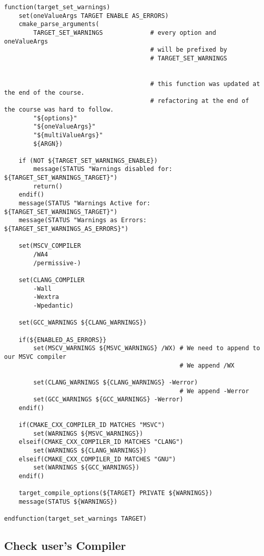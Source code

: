 \documentclass[openany]{report}
\begin{document}
\begin{verbatim}
function(target_set_warnings)
    set(oneValueArgs TARGET ENABLE AS_ERRORS)
    cmake_parse_arguments(
        TARGET_SET_WARNINGS             # every option and oneValueArgs
                                        # will be prefixed by
                                        # TARGET_SET_WARNINGS


                                        # this function was updated at the end of the course.
                                        # refactoring at the end of the course was hard to follow.
        "${options}"
        "${oneValueArgs}"
        "${multiValueArgs}"
        ${ARGN})

    if (NOT ${TARGET_SET_WARNINGS_ENABLE})
        message(STATUS "Warnings disabled for: ${TARGET_SET_WARNINGS_TARGET}")
        return()
    endif()
    message(STATUS "Warnings Active for: ${TARGET_SET_WARNINGS_TARGET}")
    message(STATUS "Warnings as Errors: ${TARGET_SET_WARNINGS_AS_ERRORS}")

    set(MSCV_COMPILER
        /WA4
        /permissive-)

    set(CLANG_COMPILER
        -Wall
        -Wextra
        -Wpedantic)

    set(GCC_WARNINGS ${CLANG_WARNINGS})

    if(${ENABLED_AS_ERRORS}}
        set(MSCV_WARNINGS ${MSVC_WARNINGS} /WX) # We need to append to our MSVC compiler
                                                # We append /WX

        set(CLANG_WARNINGS ${CLANG_WARNINGS} -Werror)
                                                # We append -Werror
        set(GCC_WARNINGS ${GCC_WARNINGS} -Werror)
    endif()

    if(CMAKE_CXX_COMPILER_ID MATCHES "MSVC")
        set(WARNINGS ${MSVC_WARNINGS})
    elseif(CMAKE_CXX_COMPILER_ID MATCHES "CLANG")
        set(WARNINGS ${CLANG_WARNINGS})
    elseif(CMAKE_CXX_COMPILER_ID MATCHES "GNU")
        set(WARNINGS ${GCC_WARNINGS})
    endif()

    target_compile_options(${TARGET} PRIVATE ${WARNINGS})
    message(STATUS ${WARNINGS})

endfunction(target_set_warnings TARGET)
\end{verbatim}

\subsection{Check user's Compiler}
\end{document}
